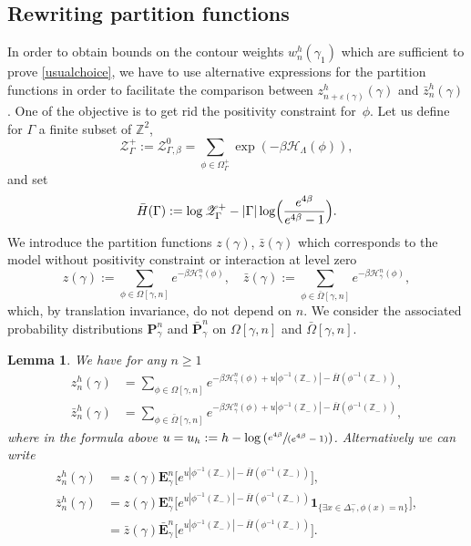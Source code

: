 \documentclass[10pt]{amsart}
\let\mathcal\mathscr
\newcommand{\spfrac}[2]{\sfrac{#1}{(#2)}}
\numberwithin{equation}{section}
\theoremstyle{plain}
\newtheorem{lemma}[theorem]{Lemma}
\theoremstyle{definition}
\newcommand{\ind}{\mathbf{1}}
\newcommand{\cH}{{\ensuremath{\mathcal H}} }
\newcommand{\cZ}{{\ensuremath{\mathcal Z}} }
\newcommand{\bP}{{\ensuremath{\mathbf P}} }
\newcommand{\bE}{{\ensuremath{\mathbf E}} }
\newcommand{\bbZ}{{\ensuremath{\mathbb Z}} }
\newcommand{\gb}{\beta}
\newcommand{\gep}{\varepsilon}
\newcommand{\gG}{\Gamma}
\newcommand{\gO}{\Omega}
\newcommand{\gL}{\Lambda}
\begin{document}
\subsection{Rewriting partition functions}

In order to obtain bounds on the contour weights $w^h_n(\gamma_1)$
which are sufficient to prove \eqref{usualchoice}, we have to use alternative expressions for the partition functions in order to facilitate
the comparison between
$z^h_{n+\gep(\gamma)}(\gamma)$ and $\bar z^h_n(\gamma)$.
One of the objective is to get rid the positivity constraint for~$\phi$.
Let us define for $\gG$ a finite subset of $\bbZ^2$,
\begin{equation*}%
\cZ^+_{\gG}:=\cZ^0_{\gG,\gb}=\sum_{\phi\in \gO^+_{\gG}} \exp\left(-\gb \cH_\gL(\phi)\right),
\end{equation*}
and set
\begin{equation*}
\bar H(\gG):= \log \cZ^+_{\gG}-|\gG|\log \Bigl(\frac{e^{4\gb}}{e^{4\gb}-1}\Bigl).
\end{equation*}
We introduce the partition functions $z(\gamma)$, $\bar z(\gamma)$ which corresponds to the model without positivity constraint or interaction at level zero
\begin{equation}\label{tambem}
z(\gamma):=\sum_{\phi\in \gO[\gamma,n]}e^{-\gb\cH^n_{\bar \gamma}(\phi)}, \quad \bar z(\gamma):=\sum_{\phi\in \bar \gO[\gamma,n]}e^{-\gb\cH^n_{\bar \gamma}(\phi)},
\end{equation}
which, by translation invariance, do not depend on $n$. We consider the associated probability distributions $\bP^n_{\gamma}$ and $\bar \bP^n_{\gamma}$ on $\gO[\gamma,n]$ and $\bar \gO[\gamma,n]$.

\begin{lemma}\label{rwo}
We have for any $n\ge 1$
\begin{equation}\label{swoutch}\begin{split}
z^h_n(\gamma)&=\sum_{\phi\in \gO[\gamma,n]} e^{-\gb \cH^n_{\bar \gamma}(\phi)+ u|\phi^{-1}(\bbZ_-)|-\bar H(\phi^{-1}(\bbZ_-))},\\
\bar z^h_n(\gamma)&=\sum_{\phi\in \bar \gO[\gamma,n]} e^{-\gb \cH^n_{\bar \gamma}(\phi)+ u|\phi^{-1}(\bbZ_-)|-\bar H(\phi^{-1}(\bbZ_-))},
\end{split}\end{equation}
where in the formula above $u=u_h:= h- \log \left(\spfrac{e^{4\gb}}{e^{4\gb}-1}\right)$.
Alternatively we can write
\begin{equation}\label{dooz}\begin{split}
z^h_n(\gamma)&= z(\gamma)\bE^n_{\gamma}\bigl[e^{u|\phi^{-1}(\bbZ_-)|-\bar H(\phi^{-1}(\bbZ_-))}\bigr],\\
\bar z^h_n(\gamma)&= z(\gamma)\bE^n_{\gamma}\bigl[e^{u|\phi^{-1}(\bbZ_-)|-\bar H(\phi^{-1}(\bbZ_-))}\ind_{\{\exists x\in \Delta^-_{\gamma}, \phi(x)=n\}} \bigr],\\
&=\bar z(\gamma)\bar \bE^n_{\gamma}\bigl[e^{u|\phi^{-1}(\bbZ_-)|-\bar H(\phi^{-1}(\bbZ_-))}\bigr].
\end{split}\end{equation}
\end{lemma}
\end{document}
